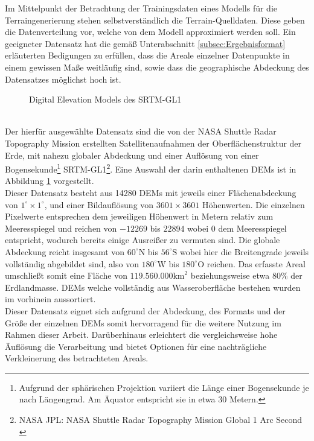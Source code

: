 Im Mittelpunkt der Betrachtung der Trainingsdaten eines Modells für die Terraingenerierung stehen selbstverständlich die Terrain-Quelldaten. Diese geben die Datenverteilung vor, welche von dem Modell approximiert werden soll. Ein geeigneter Datensatz hat die gemäß Unterabschnitt \ref{subsec:Ergebnisformat} erläuterten Bedigungen zu erfüllen, dass die Areale einzelner Datenpunkte in einem gewissen Maße weitläufig sind, sowie dass die geographische Abdeckung des Datensatzes möglichst hoch ist. 
\begin{figure}[htbp]
    \centering
    \caption{Digital Elevation Models des SRTM-GL1}
    \label{fig:SRTM_Data}
\end{figure} \\
Der hierfür ausgewählte Datensatz sind die von der NASA Shuttle Radar Topography Mission erstellten Satellitenaufnahmen der Oberflächenstruktur der Erde, mit nahezu globaler Abdeckung und einer Auflösung von einer Bogensekunde\footnote{
    Aufgrund der sphärischen Projektion variiert die Länge einer Bogensekunde je nach Längengrad. Am Äquator entspricht sie in etwa 30 Metern.
} SRTM-GL1\footnote{
    NASA JPL: NASA Shuttle Radar Topography Mission Global 1 Arc Second
    \cite{nasa2013srtm}
}. Eine Auswahl der darin enthaltenen \ac{DEM}s ist in Abbildung \ref{fig:SRTM_Data} vorgestellt. \\
Dieser Datensatz besteht aus 14280 \ac{DEM}s mit jeweils einer Flächenabdeckung von $1^{\circ}\times1^{\circ}$, und einer Bildauflösung von $3601\times3601$ Höhenwerten. Die einzelnen Pixelwerte entsprechen dem jeweiligen Höhenwert in Metern relativ zum Meeresspiegel und reichen von $-12269$ bis $22894$ wobei $0$ dem Meeresspiegel entspricht, wodurch bereits einige Ausreißer zu vermuten sind. Die globale Abdeckung reicht insgesamt von $60^{\circ}\text{N}$ bis $56^{\circ}\text{S}$ wobei hier die Breitengrade jeweils vollständig abgebildet sind, also von $180^{\circ}\text{W}$ bis $180^{\circ}\text{O}$ reichen. Das erfasste Areal umschließt somit eine Fläche von $119.560.000\text{km}^2$ beziehungsweise etwa $80\%$ der Erdlandmasse. DEMs welche vollständig aus Wasseroberfläche bestehen wurden im vorhinein aussortiert. \\
Dieser Datensatz eignet sich aufgrund der Abdeckung, des Formats und der Größe der einzelnen \ac{DEM}s somit hervorragend für die weitere Nutzung im Rahmen dieser Arbeit. Darüberhinaus erleichtert die vergleichsweise hohe Äuflösung die Verarbeitung und bietet Optionen für eine nachträgliche Verkleinerung des betrachteten Areals.

